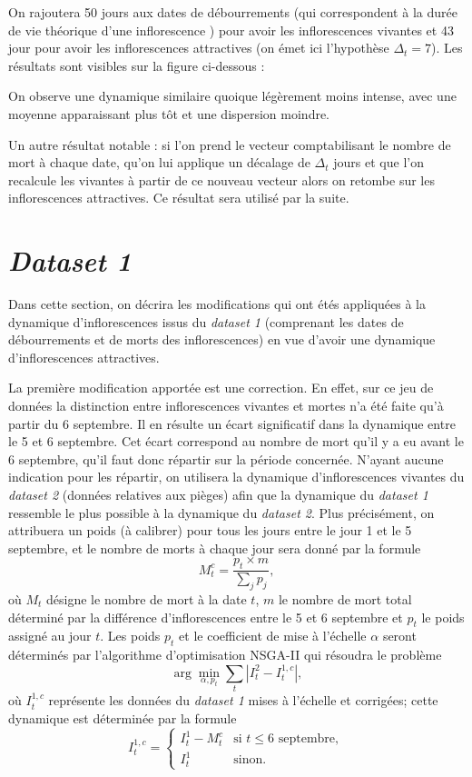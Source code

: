 \documentclass[a4paper, 11pt]{article}
\begin{document}
On rajoutera 50 jours aux dates de débourrements (qui correspondent à la durée de vie théorique d'une inflorescence \cite{laurie}) pour avoir les inflorescences vivantes et 43 jour pour avoir les inflorescences attractives (on émet ici l'hypothèse $\Delta_t = 7$). Les résultats sont visibles sur la figure ci-dessous : 

\begin{figure}[h]
 \centering
\end{figure}


On observe une dynamique similaire quoique légèrement moins intense, avec une moyenne apparaissant plus tôt et une dispersion moindre.

Un autre résultat notable : si l'on prend le vecteur comptabilisant le nombre de mort à chaque date, qu'on lui applique un décalage de $\Delta_t$ jours et que l'on recalcule les vivantes à partir de ce nouveau vecteur alors on retombe sur les inflorescences attractives.
Ce résultat sera utilisé par la suite.

\section{\textit{Dataset 1}}

Dans cette section, on décrira les modifications qui ont étés appliquées à la dynamique d'inflorescences issus du \textit{dataset 1} (comprenant les dates de débourrements et de morts des inflorescences) en vue d'avoir une dynamique d'inflorescences attractives.

La première modification apportée est une correction. En effet, sur ce jeu de données la distinction entre inflorescences vivantes et mortes n'a été faite qu'à partir du 6 septembre. Il en résulte un écart significatif dans la dynamique entre le 5 et 6 septembre. Cet écart correspond au nombre de mort qu'il y a eu avant le 6 septembre, qu'il faut donc répartir sur la période concernée. N'ayant aucune indication pour les répartir, on utilisera la dynamique d'inflorescences vivantes du \textit{dataset 2} (données relatives aux pièges) afin que la dynamique du \textit{dataset 1} ressemble le plus possible à la dynamique du \textit{dataset 2}. Plus précisément, on attribuera un poids (à calibrer) pour tous les jours entre le jour 1 et le 5 septembre, et
le nombre de morts à chaque jour sera donné par la formule
$$M_t^c = \frac{p_t \times m}{\sum_j p_j},$$
où $M_t$ désigne le nombre de mort à la date $t$, $m$ le nombre de mort total déterminé par la différence d’inflorescences entre le 5 et 6 septembre et $p_t$ le poids assigné au jour $t$. Les poids $p_t$ et le coefficient de mise à l'échelle $\alpha$ seront déterminés par l'algorithme d'optimisation NSGA-II qui résoudra le problème
$$\arg\min_{\alpha, p_t} \sum_t \left| I_t^2 - I_t^{1, c} \right|,$$
où $I_t^{1, c}$ représente les données du \textit{dataset 1} mises à l'échelle et corrigées; cette dynamique est déterminée par la formule
$$I_t^{1, c} = \begin{cases}
                I_t^1 - M_t^c & \mbox{si } t \leq 6 \mbox{ septembre},\\
                I_t^1 & \mbox{sinon}.
               \end{cases}$$
\end{document}
